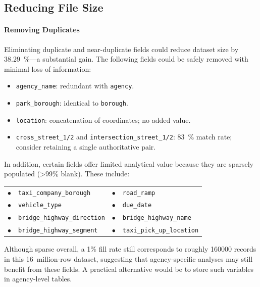 \documentclass[linenumber]{jdsart}
\newcommand{\numint}[1]{\num[round-mode=none]{#1}}
\begin{document}
\subsection{Reducing File Size}
\label{subsec:filesize}

\paragraph{Removing Duplicates}
Eliminating duplicate and near-duplicate fields could reduce dataset size by
\SI[round-precision = 2]{38.29}{\percent}—a substantial gain. The following fields could
be safely removed with minimal loss of information:

\begin{itemize}[left=1.5em]
  \item \texttt{agency\_name}: redundant with \texttt{agency}.
  \item \texttt{park\_borough}: identical to \texttt{borough}.
  \item \texttt{location}: concatenation of coordinates; no added value.
 \item \texttt{cross\_street\_1/2} and \texttt{intersection\_street\_1/2}:
\SI{83}{\percent} match rate; consider retaining a single authoritative pair.
\end{itemize}

In addition, certain fields offer limited analytical value because they are
sparsely populated (\textgreater 99\% blank). These include:

\begin{center}
\begin{minipage}{0.8\linewidth}
\begin{tabularx}{\linewidth}{@{}lX lX@{}}
$\bullet$ & \texttt{taxi\_company\_borough} &
$\bullet$ & \texttt{road\_ramp} \\
$\bullet$ & \texttt{vehicle\_type} &
$\bullet$ & \texttt{due\_date} \\
$\bullet$ & \texttt{bridge\_highway\_direction} &
$\bullet$ & \texttt{bridge\_highway\_name} \\
$\bullet$ & \texttt{bridge\_highway\_segment} &
$\bullet$ & \texttt{taxi\_pick\_up\_location} \\
\end{tabularx}
\end{minipage}
\end{center}

Although sparse overall, a 1\% fill rate still corresponds to roughly
\numint{160000} records in this 16~million-row dataset, suggesting that agency-specific analyses
may still benefit from these fields. A practical alternative would be to store
such variables in agency-level tables.
\end{document}

